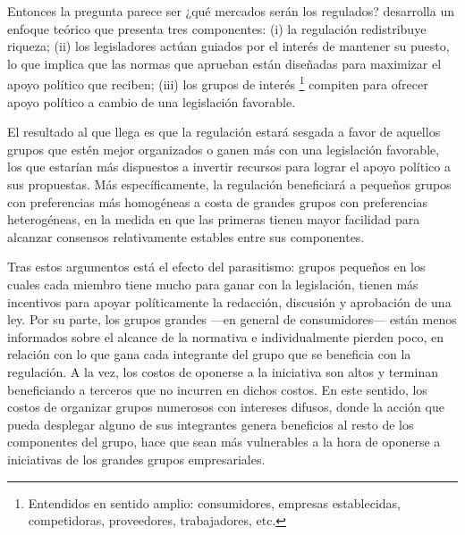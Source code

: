 \documentclass[
  12pt,
  spanish,
]{book}
\begin{document}
Entonces la pregunta parece ser ¿qué mercados serán los regulados? \citet{Peltzman1976} desarrolla un enfoque teórico que presenta tres componentes: (i) la regulación redistribuye riqueza; (ii) los legisladores actúan guiados por el interés de mantener su puesto, lo que implica que las normas que aprueban están diseñadas para maximizar el apoyo político que reciben; (iii) los grupos de interés
\footnote{Entendidos en sentido amplio: consumidores, empresas establecidas, competidoras, proveedores, trabajadores, etc.}
compiten para ofrecer apoyo político a cambio de una legislación favorable.

El resultado al que llega es que la regulación estará sesgada a favor de aquellos grupos que estén mejor organizados o ganen más con una legislación favorable, los que estarían más dispuestos a invertir recursos para lograr el apoyo político a sus propuestas. Más específicamente, la regulación beneficiará a pequeños grupos con preferencias más homogéneas a costa de grandes grupos con preferencias heterogéneas, en la medida en que las primeras tienen mayor facilidad para alcanzar consensos relativamente estables entre sus componentes.

Tras estos argumentos está el efecto del parasitismo: grupos pequeños en los cuales cada miembro tiene mucho para ganar con la legislación, tienen más incentivos para apoyar políticamente la redacción, discusión y aprobación de una ley. Por su parte, los grupos grandes ---en general de consumidores--- están menos informados sobre el alcance de la normativa e individualmente pierden poco, en relación con lo que gana cada integrante del grupo que se beneficia con la regulación. A la vez, los costos de oponerse a la iniciativa son altos y terminan beneficiando a terceros que no incurren en dichos costos. En este sentido, los costos de organizar grupos numerosos con intereses difusos, donde la acción que pueda desplegar alguno de sus integrantes genera beneficios al resto de los componentes del grupo, hace que sean más vulnerables a la hora de oponerse a iniciativas de los grandes grupos empresariales.
\end{document}
